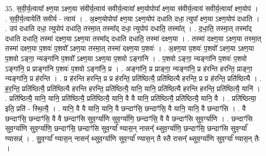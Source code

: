 \documentclass[17pt]{extarticle}
\begin{document}
35. स॒वी॒र्य॒त्वाया᳚ क्ष्ण॒या ऽक्ष्ण॒या स॑वीर्य॒त्वाय॑ सवीर्य॒त्वाया᳚ क्ष्ण॒योपोपा᳚ क्ष्ण॒या स॑वीर्य॒त्वाय॑ सवीर्य॒त्वाया᳚ क्ष्ण॒योप॑ । . स॒वी॒र्य॒त्वायेति॑ सवीर्य - त्वाय॑ । . अ॒क्ष्ण॒योपोपा᳚ क्ष्ण॒या ऽक्ष्ण॒योप॑ दधाति दधा॒ त्युपा᳚ क्ष्ण॒या ऽक्ष्ण॒योप॑ दधाति । . उप॑ दधाति दधा॒ त्युपोप॑ दधाति॒ तस्मा॒त् तस्मा᳚द् दधा॒ त्युपोप॑ दधाति॒ तस्मा᳚त् । . द॒धा॒ति॒ तस्मा॒त् तस्मा᳚द् दधाति दधाति॒ तस्मा॑ दक्ष्ण॒या ऽक्ष्ण॒या तस्मा᳚द् दधाति दधाति॒ तस्मा॑ दक्ष्ण॒या । . तस्मा॑ दक्ष्ण॒या ऽक्ष्ण॒या तस्मा॒त् तस्मा॑ दक्ष्ण॒या प॒शवः॑ प॒शवो᳚ ऽक्ष्ण॒या तस्मा॒त् तस्मा॑ दक्ष्ण॒या प॒शवः॑ । . अ॒क्ष्ण॒या प॒शवः॑ प॒शवो᳚ ऽक्ष्ण॒या ऽक्ष्ण॒या प॒शवो ऽङ्गा॒ न्यङ्गा॑नि प॒शवो᳚ ऽक्ष्ण॒या ऽक्ष्ण॒या प॒शवो ऽङ्गा॑नि । . प॒शवो ऽङ्गा॒ न्यङ्गा॑नि प॒शवः॑ प॒शवो ऽङ्गा॑नि॒ प्र प्राङ्गा॑नि प॒शवः॑ प॒शवो ऽङ्गा॑नि॒ प्र । . अङ्गा॑नि॒ प्र प्राङ्गा॒ न्यङ्गा॑नि॒ प्र ह॑रन्ति हरन्ति॒ प्राङ्गा॒ न्यङ्गा॑नि॒ प्र ह॑रन्ति । . प्र ह॑रन्ति हरन्ति॒ प्र प्र ह॑रन्ति॒ प्रति॑ष्ठित्यै॒ प्रति॑ष्ठित्यै हरन्ति॒ प्र प्र ह॑रन्ति॒ प्रति॑ष्ठित्यै । . ह॒र॒न्ति॒ प्रति॑ष्ठित्यै॒ प्रति॑ष्ठित्यै हरन्ति हरन्ति॒ प्रति॑ष्ठित्यै॒ यानि॒ यानि॒ प्रति॑ष्ठित्यै हरन्ति हरन्ति॒ प्रति॑ष्ठित्यै॒ यानि॑ । . प्रति॑ष्ठित्यै॒ यानि॒ यानि॒ प्रति॑ष्ठित्यै॒ प्रति॑ष्ठित्यै॒ यानि॒ वै वै यानि॒ प्रति॑ष्ठित्यै॒ प्रति॑ष्ठित्यै॒ यानि॒ वै । . प्रति॑ष्ठित्या॒ इति॒ प्रति॑ - स्थि॒त्यै॒ । . यानि॒ वै वै यानि॒ यानि॒ वै छन्दाꣳ॑सि॒ छन्दाꣳ॑सि॒ वै यानि॒ यानि॒ वै छन्दाꣳ॑सि । . वै छन्दाꣳ॑सि॒ छन्दाꣳ॑सि॒ वै वै छन्दाꣳ॑सि सुव॒र्ग्या॑णि सुव॒र्ग्या॑णि॒ छन्दाꣳ॑सि॒ वै वै छन्दाꣳ॑सि सुव॒र्ग्या॑णि । . छन्दाꣳ॑सि सुव॒र्ग्या॑णि सुव॒र्ग्या॑णि॒ छन्दाꣳ॑सि॒ छन्दाꣳ॑सि सुव॒र्ग्या᳚ ण्यास॒न् नासन्᳚ थ्सुव॒र्ग्या॑णि॒ छन्दाꣳ॑सि॒ छन्दाꣳ॑सि सुव॒र्ग्या᳚ ण्यासन्न्॑ । . सु॒व॒र्ग्या᳚ ण्यास॒न् नासन्᳚ थ्सुव॒र्ग्या॑णि सुव॒र्ग्या᳚ ण्यास॒न् तै स्तै रासन्᳚ थ्सुव॒र्ग्या॑णि सुव॒र्ग्या᳚ ण्यास॒न् तैः । \newline
\end{document}
